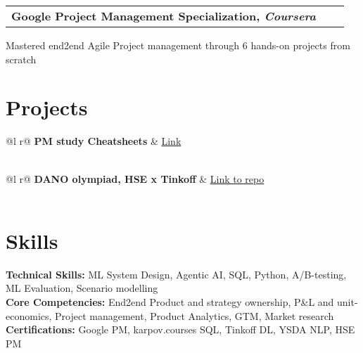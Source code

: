 \documentclass[a4paper,12pt]{article}
\makeatletter
\newenvironment{jobshort}[2]
    {
    \begin{tabularx}{\linewidth}{@{}l X r@{}}
    \textbf{#1} & \hfill &  #2 \\[0.25pt]
    \end{tabularx}
    }
    {
    }
\makeatother
\begin{document}
\begin{jobshort}{Google Project Management Specialization, \textit{Coursera}}{}
\end{jobshort}
\noindent Mastered end2end Agile Project management through 6 hands-on projects from scratch

\section{Projects}

\begin{tabularx}{\linewidth}{ @{}l r@{} }
\textbf{PM study Cheatsheets} & \hfill \href{https://slavikss.github.io/blog}{Link} \\[3.75pt]
  \\
\end{tabularx}

\begin{tabularx}{\linewidth}{ @{}l r@{} }
\textbf{DANO olympiad, HSE x Tinkoff} & \hfill \href{https://github.com/Slavikss/tinkoff-cinema-tickets}{Link to repo} \\[3.75pt]
  \\
\end{tabularx}


\section{Skills}
\textbf{Technical Skills:} ML System Design, Agentic AI, SQL, Python, A/B-testing, ML Evaluation, Scenario modelling \\
\textbf{Core Competencies:} End2end Product and strategy ownership, P\&L and unit-economics, Project management, Product Analytics, GTM, Market research \\
\textbf{Certifications:} Google PM, karpov.courses SQL, Tinkoff DL, YSDA NLP, HSE PM \\

\enlargethispage{-\baselineskip}
\end{document}
